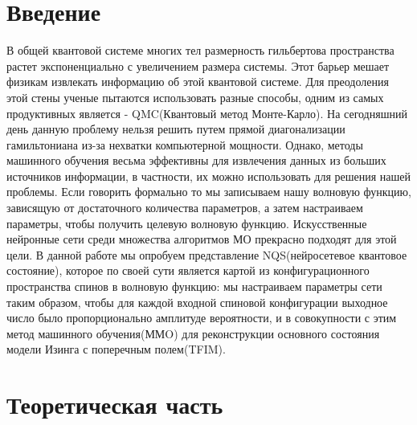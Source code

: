 \section{Введение}
\vspace{0.5cm}

   В общей квантовой системе многих тел размерность гильбертова пространства растет экспоненциально с увеличением размера системы. Этот барьер мешает физикам извлекать информацию об этой квантовой системе. Для преодоления этой стены ученые пытаются использовать разные способы, одним из самых продуктивных является - QMC(Квантовый метод Монте-Карло). На сегодняшний день данную проблему нельзя решить путем прямой диагонализации гамильтониана из-за нехватки компьютерной мощности. Однако, методы машинного обучения весьма эффективны для извлечения данных из больших источников информации, в частности, их можно использовать для решения нашей проблемы. Если говорить формально то мы записываем нашу волновую функцию, зависящую от достаточного количества параметров, а затем настраиваем параметры, чтобы получить целевую волновую функцию. Искусственные нейронные сети среди множества алгоритмов МО прекрасно подходят для этой цели. В данной работе мы опробуем представление NQS(нейросетевое квантовое состояние), которое по своей сути является картой из конфигурационного пространства спинов в волновую функцию: мы настраиваем параметры сети таким образом, чтобы для каждой входной спиновой конфигурации выходное число было пропорционально амплитуде вероятности, и в совокупности с этим метод машинного обучения(ММO) для реконструкции основного состояния модели Изинга с поперечным полем(TFIM).




\section{Теоретическая часть}
